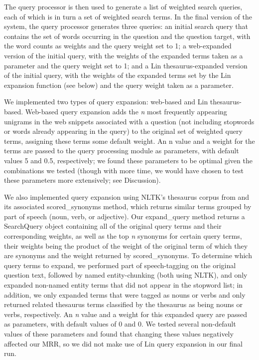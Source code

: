 \documentclass[11pt]{article}
\begin{document}
The query processor is then used to generate a list of weighted search queries, each of which is in turn a set of weighted search terms. In the final version of the system, the query processor generates three queries: an initial search query that contains the set of words occurring in the question and the question target, with the word counts as weights and the query weight set to 1; a web-expanded version of the initial query, with the weights of the expanded terms taken as a parameter and the query weight set to 1; and a Lin thesaurus-expanded version of the initial query, with the weights of the expanded terms set by the Lin expansion function (see below) and the query weight taken as a parameter.

We implemented two types of query expansion: web-based and Lin thesaurus-based. Web-based query expansion adds the \emph{n} most frequently appearing unigrams in the web snippets associated with a question (not including stopwords or words already appearing in the query) to the original set of weighted query terms, assigning these terms some default weight. An n value and a weight for the terms are passed to the query processing module as parameters, with default values 5 and 0.5, respectively; we found these parameters to be optimal given the combinations we tested (though with more time, we would have chosen to test these parameters more extensively; see Discussion).

We also implemented query expansion using NLTK's thesaurus corpus from  and its associated scored\_synonyms method, which returns similar terms grouped by part of speech (noun, verb, or adjective). Our expand\_query method returns a SearchQuery object containing all of the original query terms and their corresponding weights, as well as the top \emph{n} synonyms for certain query terms, their weights being the product of the weight of the original term of which they are synonyms and the weight returned by scored\_synonyms. To determine which query terms to expand, we performed part of speech-tagging on the original question text, followed by named entity-chunking (both using NLTK), and only expanded non-named entity terms that did not appear in the stopword list; in addition, we only expanded terms that were tagged as nouns or verbs and only returned related thesaurus terms classified by the thesaurus as being nouns or verbs, respectively. An \emph{n} value and a weight for this expanded query are passed as parameters, with default values of 0 and 0. We tested several non-default values of these parameters and found that changing these values negatively affected our MRR, so we did not make use of Lin query expansion in our final run.
\end{document}
